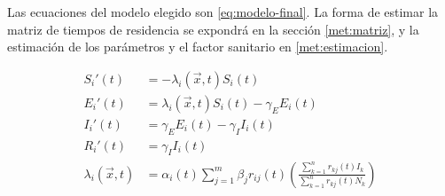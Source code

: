 Las ecuaciones del modelo elegido son \ref{eq:modelo-final}. La forma de estimar la matriz de tiempos de residencia se expondrá en la sección \ref{met:matriz}, y la estimación de los parámetros y el factor sanitario en \ref{met:estimacion}.

\begin{equation}\label{eq:modelo-final}
\begin{aligned}
S_i'(t) &= - \lambda_i(\vec{x}, t) S_i(t) \\
E_i'(t) &= \lambda_i(\vec{x}, t) S_i(t)  - \gamma_E E_i(t) \\ 
I_i'(t) &= \gamma_E E_i(t)  - \gamma_I I_i(t) \\ 
R_i'(t) &= \gamma_I I_i(t) \\
\lambda_i(\vec{x}, t) &= \alpha_i(t)\sum_{j=1}^m \beta_{j}r_{ij}(t)\left(\frac{\sum_{k=1}^{n}r_{kj}(t) I_k}{\sum_{k=1}^{n}r_{kj}(t)N_k}\right)
\end{aligned}
\end{equation}







